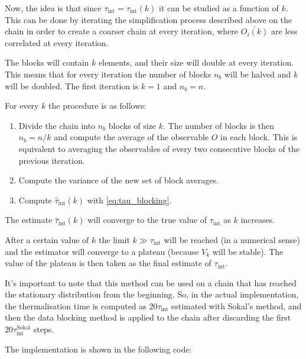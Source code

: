 \br

Now, the idea is that since $\tau_{\text{int}} = \tau_{\text{int}}(k)$ it can be studied as a function of $k$. This can be done by iterating the simplification process described above on the chain in order to create a coarser chain at every iteration, where $\bar{O_i (k)}$ are less correlated at every iteration.

The blocks will contain $k$ elements, and their size will double at every iteration. This means that for every iteration the number of blocks $n_b$ will be halved and $k$ will be doubled. The first iteration is $k = 1$ and $n_b = n$.

For every $k$ the procedure is as follows:

\begin{enumerate}
	\item Divide the chain into $n_b$ blocks of size $k$. The number of blocks is then $n_b = n / k$ and compute the average of the observable $O$ in each block. This is equivalent to averaging the observables of every two consecutive blocks of the previous iteration.
	\item Compute the variance of the new set of block averages.
	\item Compute $\hat{\tau}_{\text{int}}(k)$ with \eqref{eq:tau_blocking}.
\end{enumerate}

The estimate $\hat{\tau}_{\text{int}}(k)$ will converge to the true value of $\tau_{\text{int}}$ as $k$ increases.

After a certain value of $k$ the limit $k \gg \tau_{\text{int}}$ will be reached (in a numerical sense) and the estimator will converge to a plateau (because $V_k$ will be stable). The value of the plateau is then taken as the final estimate of $\tau_{\text{int}}$.

It's important to note that this method can be used on a chain that has reached the stationary distribution from the beginning. So, in the actual implementation, the thermalisation time is computed as $20 \tau_{\text{int}}$ estimated with Sokal's method, and then the data blocking method is applied to the chain after discarding the first $20 \tau_{\text{int}}^{\text{Sokal}}$ steps. 

The implementation is shown in the following code:

